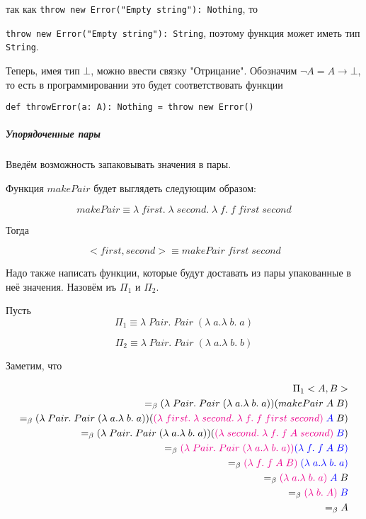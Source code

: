 так как \texttt{throw new Error("Empty string"): Nothing}, то 

\texttt{throw new Error("Empty string"): String}, поэтому функция может иметь тип \texttt{String}.

Теперь, имея тип $\bot$, можно ввести связку "Отрицание". Обозначим $\neg A = A \rightarrow \bot$, то есть в программировании это будет соответствовать функции

\begin{verbatim}
def throwError(a: A): Nothing = throw new Error()
\end{verbatim}

\subparagraph{Упорядоченные пары}

Введём возможность запаковывать значения в пары.

Функция $makePair$ будет выглядеть следующим образом:

$$makePair \equiv \lambda \; first. \; \lambda \; second. \; \lambda \; f. \; f \; first \; second$$

Тогда 

$$<first, second> \equiv makePair \; first \; second$$

Надо также написать функции, которые будут доставать из пары упакованные в неё значения. Назовём иъ $\Pi_1$ и $\Pi_2$. 

Пусть 
$$\Pi_1 \equiv \lambda \; Pair. \; Pair \; (\lambda \; a. \lambda \; b. \; a)$$

$$\Pi_2 \equiv \lambda \; Pair. \; Pair \; (\lambda \; a. \lambda \; b. \; b)$$

Заметим, что 

\begin{align*}
	\Pi_1 <A, B> \\
	=_{\beta} (\lambda \; Pair. \; Pair \; (\lambda \; a. \lambda \; b. \; a)) (makePair \; A \; B)\\ =_\beta (\lambda \; Pair. \; Pair \; (\lambda \; a. \lambda \; b. \; a)) (\textcolor{magenta}{(\lambda \; first. \; \lambda \; second. \; \lambda \; f. \; f \; first \; second)} \; \textcolor{blue}{A} \; B) \\ =_\beta (\lambda \; Pair. \; Pair \; (\lambda \; a. \lambda \; b. \; a)) (\textcolor{magenta}{(\lambda \; second. \; \lambda \; f. \; f \; A \; second)} \; \textcolor{blue}{B}) \\ =_\beta \textcolor{magenta}{(\lambda \; Pair. \; Pair \; (\lambda \; a. \lambda \; b. \; a))} \textcolor{blue}{(\lambda \; f. \; f \; A \; B)} \\ =_\beta \textcolor{magenta}{(\lambda \; f. \; f \; A \; B)} \; \textcolor{blue}{(\lambda \; a. \lambda \; b. \; a)} \\ =_\beta \textcolor{magenta}{(\lambda \; a. \lambda \; b. \; a)} \; \textcolor{blue}{A} \; B \\ =_\beta \textcolor{magenta}{(\lambda \; b. \; A)} \; \textcolor{blue}{B} \\ =_\beta A
\end{align*}

